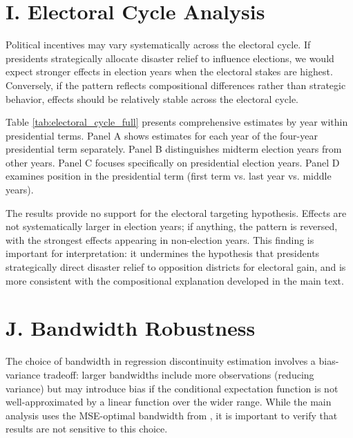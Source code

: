 \documentclass[12pt,letterpaper,oneside]{book}
\newcommand{\basepath}{g:/My Drive/Grad School}
\newcommand{\basepath}{basepath}
\begin{document}

\label{tab:placebo_thresholds}

\section*{I. Electoral Cycle Analysis}

Political incentives may vary systematically across the electoral cycle. If presidents strategically allocate disaster relief to influence elections, we would expect stronger effects in election years when the electoral stakes are highest. Conversely, if the pattern reflects compositional differences rather than strategic behavior, effects should be relatively stable across the electoral cycle.

Table \ref{tab:electoral_cycle_full} presents comprehensive estimates by year within presidential terms. Panel A shows estimates for each year of the four-year presidential term separately. Panel B distinguishes midterm election years from other years. Panel C focuses specifically on presidential election years. Panel D examines position in the presidential term (first term vs. last year vs. middle years).

The results provide no support for the electoral targeting hypothesis. Effects are not systematically larger in election years; if anything, the pattern is reversed, with the strongest effects appearing in non-election years. This finding is important for interpretation: it undermines the hypothesis that presidents strategically direct disaster relief to opposition districts for electoral gain, and is more consistent with the compositional explanation developed in the main text.



\section*{J. Bandwidth Robustness}

The choice of bandwidth in regression discontinuity estimation involves a bias-variance tradeoff: larger bandwidths include more observations (reducing variance) but may introduce bias if the conditional expectation function is not well-approximated by a linear function over the wider range. While the main analysis uses the MSE-optimal bandwidth from \cite{calonico2014robust}, it is important to verify that results are not sensitive to this choice.
\end{document}
